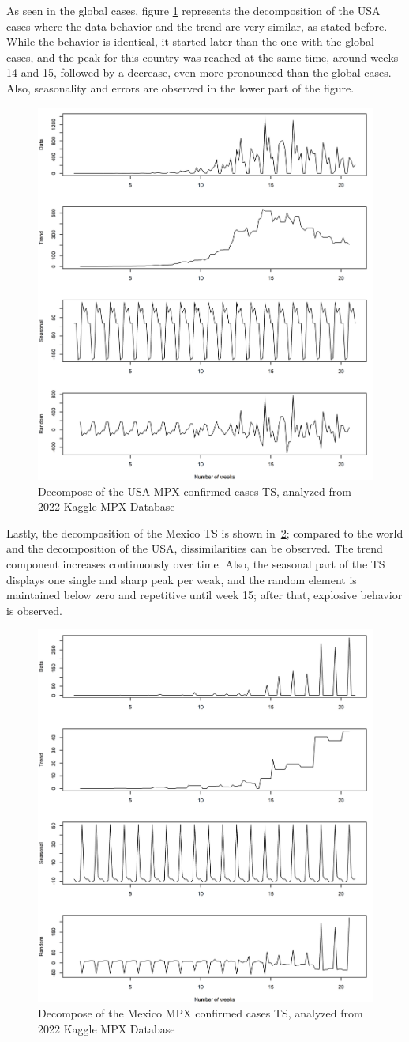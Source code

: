 \documentclass[conference]{IEEEtran}
\begin{document}
As seen in the global cases, figure \ref{fig:USADecompose} represents the decomposition of the USA cases where the data behavior and the trend are very similar, as stated before. While the behavior is identical, it started later than the one with the global cases, and the peak for this country was reached at the same time, around weeks 14 and 15, followed by a decrease, even more pronounced than the global cases. Also, seasonality and errors are observed in the lower part of the figure.

\begin{figure}[H]
    \centering
    \includegraphics[width = 6 cm]{USA_Decompose.png}
    \caption{Decompose of the USA MPX confirmed cases TS, analyzed from 2022 Kaggle MPX Database~\cite{Contractor2022}}
    \label{fig:USADecompose}
\end{figure}

Lastly, the decomposition of the Mexico TS is shown in~\ref{fig:MexicoDecompose}; compared to the world and the decomposition of the USA, dissimilarities can be observed. The trend component increases continuously over time. Also, the seasonal part of the TS displays one single and sharp peak per weak, and the random element is maintained below zero and repetitive until week 15; after that, explosive behavior is observed.
\begin{figure}[H]
    \centering
    \includegraphics[width = 6 cm]{Mexico_Decompose.png}
    \caption{Decompose of the Mexico MPX confirmed cases TS, analyzed from 2022 Kaggle MPX Database~\cite{Contractor2022}}
    \label{fig:MexicoDecompose}
\end{figure}
\end{document}
